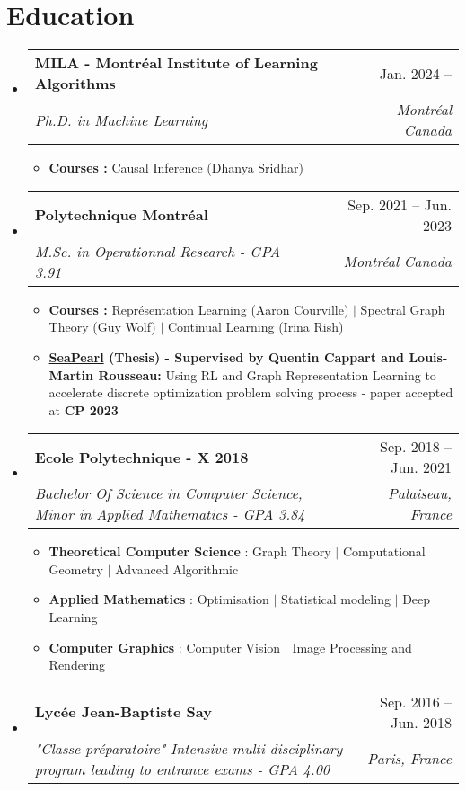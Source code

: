 \documentclass[letterpaper,11pt]{article}
\makeatletter
\newcommand{\resumeSubheading}[4]{
  \vspace{-2pt}\item
    \begin{tabular*}{0.97\textwidth}[t]{l@{\extracolsep{\fill}}r}
      \textbf{#1} & #2 \\
      \textit{\small#3} & \textit{\small #4} \\
    \end{tabular*}\vspace{-7pt}
}
\newcommand{\resumeSubHeadingListStart}{\begin{itemize}[leftmargin=0.15in, label={}]}
\newcommand{\resumeSubHeadingListEnd}{\end{itemize}}
\makeatother
\begin{document}
\section{Education}
  \resumeSubHeadingListStart
        \resumeSubheading
      {MILA - Montréal Institute of Learning Algorithms}{Jan. 2024 -- }
      {Ph.D. in Machine Learning}{Montréal Canada}
      \vspace{.2pt}
      \begin{itemize}
          \item \textbf{Courses :} Causal Inference (Dhanya Sridhar)
      \end{itemize}
      \resumeSubheading
      {Polytechnique Montréal}{Sep. 2021 -- Jun. 2023}
      {M.Sc. in Operationnal Research - GPA 3.91}{Montréal Canada}
      \vspace{.2pt}
      \begin{itemize}
          \item \textbf{Courses :} Représentation Learning (Aaron Courville) $|$ Spectral Graph Theory (Guy Wolf) $|$ Continual Learning (Irina Rish)  
          \item \textbf{\href{https://github.com/corail-research/SeaPearl.jl}{SeaPearl} (Thesis) - Supervised by Quentin Cappart and Louis-Martin Rousseau:} Using RL and Graph Representation Learning to accelerate discrete optimization problem solving process - paper accepted at \textbf{CP 2023}
      \end{itemize}
    \resumeSubheading
      {Ecole Polytechnique - X 2018}{Sep. 2018 -- Jun. 2021}
      {Bachelor Of Science in Computer Science, Minor in Applied Mathematics - GPA 3.84}{Palaiseau, France}
      \vspace{.2pt}
      \begin{itemize}
          \item \textbf{Theoretical Computer Science} : Graph Theory $|$ Computational Geometry $|$ Advanced Algorithmic
          \item \textbf{Applied Mathematics} : Optimisation $|$ Statistical modeling $|$ Deep Learning
          \item \textbf{Computer Graphics} : Computer Vision $|$ Image Processing and Rendering
      \end{itemize}
    \resumeSubheading
      {Lycée Jean-Baptiste Say}{Sep. 2016 -- Jun. 2018}
      {"Classe préparatoire" Intensive multi-disciplinary program leading to entrance exams - GPA 4.00}{Paris, France} 
  \resumeSubHeadingListEnd


\end{document}

